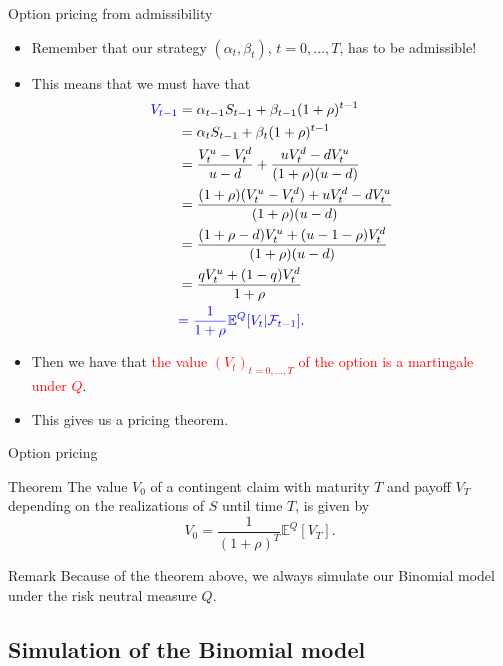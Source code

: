 \documentclass[9 pt]{beamer} %
\def \blue {\textcolor{blue}}
\def \red {\textcolor{red}}
\def \F {\mathcal{F}}
\def \bE {\mathbb{E}}
\begin{document}
\begin{frame}{Option pricing from admissibility}
\begin{itemize}
\item Remember that our strategy $(\alpha_t,\beta_t)$, $t=0, \dots, T$, has to be admissible!
\item This means that we must have that
\begin{align}
\blue{V_{t-1}}&=\alpha_{t-1} S_{t-1} + \beta_{t-1}(1+\rho)^{t-1}\notag \\
&=\alpha_{t} S_{t-1} + \beta_{t}(1+\rho)^{t-1}\notag \\
&=\frac{V_t^u-V_t^d}{u-d}+ \frac{uV_t^d-dV_t^u}{(1+\rho)(u-d)}\notag \\
&=\frac{(1+\rho)(V_t^u-V_t^d)+uV_t^d-dV_t^u}{(1+\rho)(u-d)}\notag \\
&=\frac{(1+\rho-d)V_t^u+(u-1-\rho)V_t^d}{(1+\rho)(u-d)}\notag \\
&=\frac{qV_t^u+(1-q)V_t^d}{1+\rho}\notag \\
&\blue{=\frac{1}{1+\rho}\bE^Q[V_t|\F_{t-1}]}\notag.
\end{align}
\item Then we have that \red{the value $(V_t)_{t=0,\dots,T}$ of the option is a martingale under $Q$}.
\item This gives us a pricing theorem.
\end{itemize}
\end{frame}


\begin{frame}{Option pricing}
\begin{block}{Theorem}
The value $V_0$  of a contingent claim with maturity $T$ and payoff $V_T$ depending on the realizations of $S$ until time $T$, is given by
$$
V_0=\frac{1}{(1+\rho)^T}\bE^Q[V_T].
$$
\end{block}

\begin{block}{Remark}
Because of the theorem above, we always simulate our Binomial model under the risk neutral measure $Q$.
\end{block}
\end{frame}

\subsection{Simulation of the Binomial model}
\frame{  \tableofcontents[
    sectionstyle=show/shaded,
    subsectionstyle=show/shaded/shaded,
    subsubsectionstyle=show/shaded/shaded/shaded
    ]}
    
\end{document}
